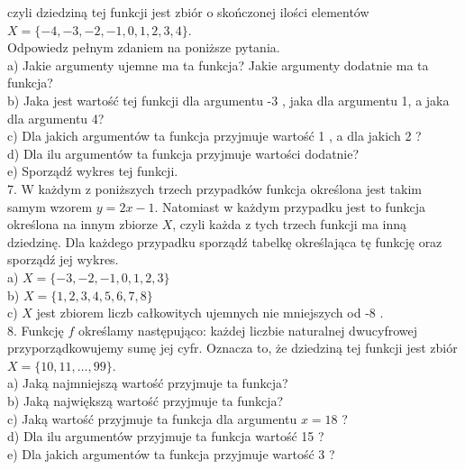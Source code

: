 \documentclass[10pt]{article}
\begin{document}
czyli dziedziną tej funkcji jest zbiór o skończonej ilości elementów \(X=\{-4,-3,-2,-1,0,1,2,3,4\}\).\\
Odpowiedz pełnym zdaniem na poniższe pytania.\\
a) Jakie argumenty ujemne ma ta funkcja? Jakie argumenty dodatnie ma ta funkcja?\\
b) Jaka jest wartość tej funkcji dla argumentu -3 , jaka dla argumentu 1, a jaka dla argumentu 4?\\
c) Dla jakich argumentów ta funkcja przyjmuje wartość 1 , a dla jakich 2 ?\\
d) Dla ilu argumentów ta funkcja przyjmuje wartości dodatnie?\\
e) Sporządź wykres tej funkcji.\\
7. W każdym z poniższych trzech przypadków funkcja określona jest takim samym wzorem \(y=2 x-1\). Natomiast w każdym przypadku jest to funkcja określona na innym zbiorze \(X\), czyli każda z tych trzech funkcji ma inną dziedzinę. Dla każdego przypadku sporządź tabelkę określająca tę funkcję oraz sporządź jej wykres.\\
a) \(X=\{-3,-2,-1,0,1,2,3\}\)\\
b) \(X=\{1,2,3,4,5,6,7,8\}\)\\
c) \(X\) jest zbiorem liczb całkowitych ujemnych nie mniejszych od -8 .\\
8. Funkcję \(f\) określamy następująco: każdej liczbie naturalnej dwucyfrowej przyporządkowujemy sumę jej cyfr. Oznacza to, że dziedziną tej funkcji jest zbiór \(X=\{10,11, \ldots, 99\}\).\\
a) Jaką najmniejszą wartość przyjmuje ta funkcja?\\
b) Jaką największą wartość przyjmuje ta funkcja?\\
c) Jaką wartość przyjmuje ta funkcja dla argumentu \(x=18\) ?\\
d) Dla ilu argumentów przyjmuje ta funkcja wartość 15 ?\\
e) Dla jakich argumentów ta funkcja przyjmuje wartość 3 ?
\end{document}

